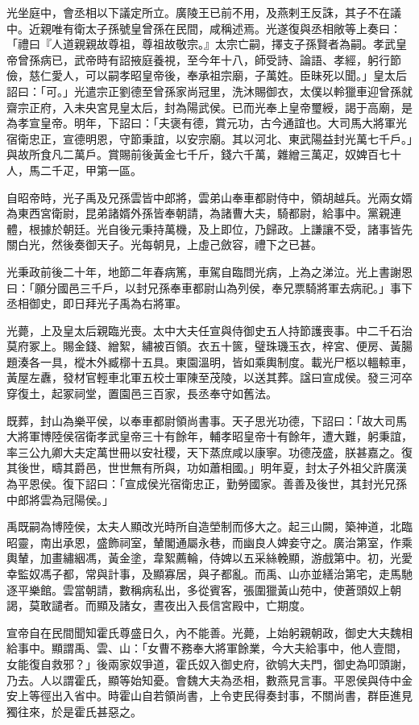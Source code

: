 \begin{pinyinscope}
光坐庭中，會丞相以下議定所立。廣陵王已前不用，及燕剌王反誅，其子不在議中。近親唯有衛太子孫號皇曾孫在民間，咸稱述焉。光遂復與丞相敞等上奏曰：「禮曰『人道親親故尊祖，尊祖故敬宗。』太宗亡嗣，擇支子孫賢者為嗣。孝武皇帝曾孫病已，武帝時有詔掖庭養視，至今年十八，師受詩、論語、孝經，躬行節儉，慈仁愛人，可以嗣孝昭皇帝後，奉承祖宗廟，子萬姓。臣昧死以聞。」皇太后詔曰：「可。」光遣宗正劉德至曾孫家尚冠里，洗沐賜御衣，太僕以軨獵車迎曾孫就齋宗正府，入未央宮見皇太后，封為陽武侯。已而光奉上皇帝璽綬，謁于高廟，是為孝宣皇帝。明年，下詔曰：「夫褒有德，賞元功，古今通誼也。大司馬大將軍光宿衛忠正，宣德明恩，守節秉誼，以安宗廟。其以河北、東武陽益封光萬七千戶。」與故所食凡二萬戶。賞賜前後黃金七千斤，錢六千萬，雜繒三萬疋，奴婢百七十人，馬二千疋，甲第一區。

自昭帝時，光子禹及兄孫雲皆中郎將，雲弟山奉車都尉侍中，領胡越兵。光兩女婿為東西宮衛尉，昆弟諸婿外孫皆奉朝請，為諸曹大夫，騎都尉，給事中。黨親連體，根據於朝廷。光自後元秉持萬機，及上即位，乃歸政。上謙讓不受，諸事皆先關白光，然後奏御天子。光每朝見，上虛己斂容，禮下之已甚。

光秉政前後二十年，地節二年春病篤，車駕自臨問光病，上為之涕泣。光上書謝恩曰：「願分國邑三千戶，以封兄孫奉車都尉山為列侯，奉兄票騎將軍去病祀。」事下丞相御史，即日拜光子禹為右將軍。

光薨，上及皇太后親臨光喪。太中大夫任宣與侍御史五人持節護喪事。中二千石治莫府冢上。賜金錢、繒絮，繡被百領。衣五十篋，璧珠璣玉衣，梓宮、便房、黃腸題湊各一具，樅木外臧槨十五具。東園溫明，皆如乘輿制度。載光尸柩以轀輬車，黃屋左纛，發材官輕車北軍五校士軍陳至茂陵，以送其葬。諡曰宣成侯。發三河卒穿復土，起冢祠堂，置園邑三百家，長丞奉守如舊法。

既葬，封山為樂平侯，以奉車都尉領尚書事。天子思光功德，下詔曰：「故大司馬大將軍博陸侯宿衛孝武皇帝三十有餘年，輔孝昭皇帝十有餘年，遭大難，躬秉誼，率三公九卿大夫定萬世冊以安社稷，天下蒸庶咸以康寧。功德茂盛，朕甚嘉之。復其後世，疇其爵邑，世世無有所與，功如蕭相國。」明年夏，封太子外祖父許廣漢為平恩侯。復下詔曰：「宣成侯光宿衛忠正，勤勞國家。善善及後世，其封光兄孫中郎將雲為冠陽侯。」

禹既嗣為博陸侯，太夫人顯改光時所自造塋制而侈大之。起三山闕，築神道，北臨昭靈，南出承恩，盛飾祠室，輦閣通屬永巷，而幽良人婢妾守之。廣治第室，作乘輿輦，加畫繡絪馮，黃金塗，韋絮薦輪，侍婢以五采絲輓顯，游戲第中。初，光愛幸監奴馮子都，常與計事，及顯寡居，與子都亂。而禹、山亦並繕治第宅，走馬馳逐平樂館。雲當朝請，數稱病私出，多從賓客，張圍獵黃山苑中，使蒼頭奴上朝謁，莫敢譴者。而顯及諸女，晝夜出入長信宮殿中，亡期度。

宣帝自在民間聞知霍氏尊盛日久，內不能善。光薨，上始躬親朝政，御史大夫魏相給事中。顯謂禹、雲、山：「女曹不務奉大將軍餘業，今大夫給事中，他人壹間，女能復自救邪？」後兩家奴爭道，霍氏奴入御史府，欲鸲大夫門，御史為叩頭謝，乃去。人以謂霍氏，顯等始知憂。會魏大夫為丞相，數燕見言事。平恩侯與侍中金安上等徑出入省中。時霍山自若領尚書，上令吏民得奏封事，不關尚書，群臣進見獨往來，於是霍氏甚惡之。


\end{pinyinscope}
